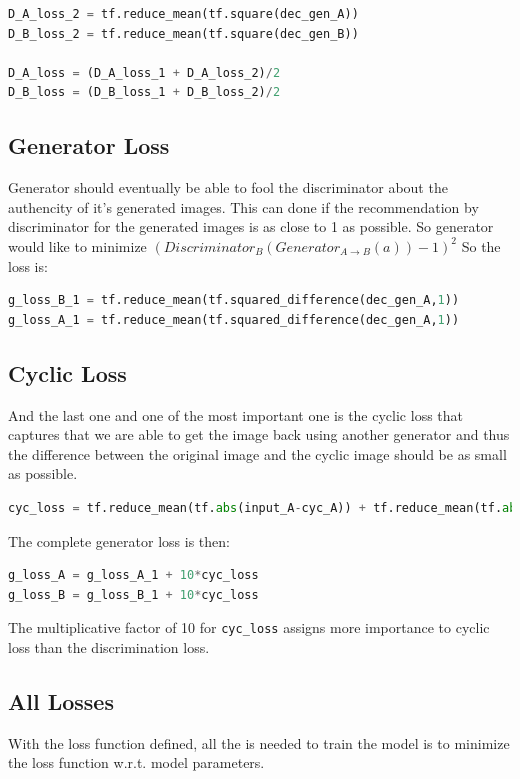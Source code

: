 \documentclass[peerreview]{IEEEtran}
\begin{document}
\begin{lstlisting}[language=Python]
D_A_loss_2 = tf.reduce_mean(tf.square(dec_gen_A))
D_B_loss_2 = tf.reduce_mean(tf.square(dec_gen_B))

D_A_loss = (D_A_loss_1 + D_A_loss_2)/2
D_B_loss = (D_B_loss_1 + D_B_loss_2)/2
\end{lstlisting}

\subsection*{Generator Loss}
Generator should eventually be able to fool the discriminator about the authencity of it's generated images. This can done if the recommendation by discriminator for the generated images is as close to 1 as possible. So generator would like to minimize $(Discriminator_B(Generator_{A \to B}(a))−1)^2$ So the loss is:

\begin{lstlisting}[language=Python]
g_loss_B_1 = tf.reduce_mean(tf.squared_difference(dec_gen_A,1))
g_loss_A_1 = tf.reduce_mean(tf.squared_difference(dec_gen_A,1))
\end{lstlisting}

\subsection*{Cyclic Loss}
And the last one and one of the most important one is the cyclic loss that captures that we are able to get the image back using another generator and thus the difference between the original image and the cyclic image should be as small as possible.

\begin{lstlisting}[language=Python]
cyc_loss = tf.reduce_mean(tf.abs(input_A-cyc_A)) + tf.reduce_mean(tf.abs(input_B-cyc_B))
\end{lstlisting}

The complete generator loss is then:

\begin{lstlisting}[language=Python]
g_loss_A = g_loss_A_1 + 10*cyc_loss
g_loss_B = g_loss_B_1 + 10*cyc_loss
\end{lstlisting}

The multiplicative factor of 10 for \verb!cyc_loss! assigns more importance to cyclic loss than the discrimination loss.

\subsection*{All Losses}
With the loss function defined, all the is needed to train the model is to minimize the loss function w.r.t. model parameters.
\end{document}
